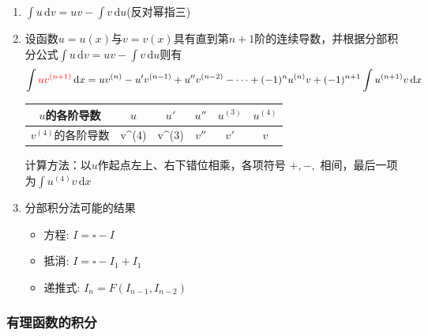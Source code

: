\documentclass[a4paper,12pt]{article}
\begin{document}
    \begin{enumerate}
        \item $\int u\,\mathrm{d}v = uv - \int v\,\mathrm{d}u$(反对幂指三)
        \item 设函数$u = u(x)$与$v = v(x)$具有直到第$n+1$阶的连续导数，并根据分部积分公式$\int u\,\mathrm{d}v = uv - \int v\,\mathrm{d}u$则有
        \[
            \int {\color{red}{uv^{(n+1)}}}\,\mathrm{d}x = uv^{(n)} - u'v^{(n-1)} + u''v^{(n-2)}- \cdots + (-1)^{n}u^{(n)}v + (-1)^{n+1}\int u^{(n+1)}v\,\mathrm{d}x
        \]

        \begin{center}
            \begin{tabular}{c|c|c|c|c|c}
                \hline
                $u$的各阶导数       & $u$     & $u'$    & $u''$ & $u^{(3)}$ & $u^{(4)}$ \\
                \hline
                $v^{(4)}$的各阶导数 & v^{(4)} & v^{(3)} & $v''$ & $v'$      & $v$       \\
                \hline
            \end{tabular}
        \end{center}

        计算方法：以$u$作起点左上、右下错位相乘，各项符号 $+,-,$ 相间，最后一项为$\int u^{(4)}v\,\mathrm{d}x$
        \item 分部积分法可能的结果
        \begin{itemize}
            \item 方程: $I = \square - I$
            \item 抵消: $I = \square - I_1 + I_1$
            \item 递推式: $I_n = F(I_{n-1}, I_{n-2})$
        \end{itemize}

    \end{enumerate}

    \subsubsection{有理函数的积分}
\end{document}

